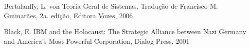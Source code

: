 \documentclass[
12pt,		%
openright,	%
twoside,  %
a4paper,			%
chapter=TITLE,		%
english,			%
french,				%
spanish,			%
brazil				%
]{USPSC-classe/USPSC}
\begin{document}
\begin{flushleft}
\begin{flushleft}
\begin{flushleft}
\begin{flushleft}
\begin{flushleft}
\begin{flushleft}
\begin{flushleft}
\begin{flushleft}
\begin{flushleft}
[BERTALANFFY, 1968] Bertalanffy, L. von Teoria Geral de Sistemas, Tradu\c{c}\~ao de Francisco M. Guimar\~aes, 2a. edi\c{c}\~ao, Editora Vozes, 2006
\end{flushleft}


\end{flushleft}


\end{flushleft}


\end{flushleft}


\end{flushleft}


\end{flushleft}


\end{flushleft}


\end{flushleft}


\end{flushleft}


\begin{flushleft}
\begin{flushleft}
\begin{flushleft}
\begin{flushleft}
\begin{flushleft}
\begin{flushleft}
\begin{flushleft}
\begin{flushleft}
\begin{flushleft}
[BLACK, 2001] Black, E. IBM and the Holocaust: The Strategic Alliance between Nazi Germany and America's Most Powerful Corporation, Dialog Press, 2001
\end{flushleft}


\end{flushleft}


\end{flushleft}


\end{flushleft}


\end{flushleft}


\end{flushleft}


\end{flushleft}


\end{flushleft}


\end{flushleft}
\end{document}
